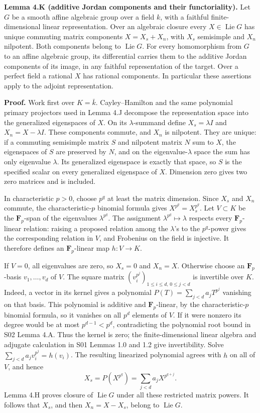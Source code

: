 \documentclass[11pt,a4paper,openany]{report}
\begin{document}
\textbf{Lemma 4.K (additive Jordan components and their functoriality).} Let \(G\) be a smooth affine algebraic group over a field \(k\), with a faithful finite-dimensional linear representation. Over an algebraic closure every \(X\in\operatorname{Lie}G\) has unique commuting matrix components \(X=X_s+X_n\), with \(X_s\) semisimple and \(X_n\) nilpotent. Both components belong to \(\operatorname{Lie}G\). For every homomorphism from \(G\) to an affine algebraic group, its differential carries them to the additive Jordan components of its image, in any faithful representation of the target. Over a perfect field a rational \(X\) has rational components. In particular these assertions apply to the adjoint representation.

\textbf{Proof.} Work first over \(K=\bar k\). Cayley--Hamilton and the same polynomial primary projectors used in Lemma 4.J decompose the representation space into the generalized eigenspaces of \(X\). On its \(\lambda\)-summand define \(X_s=\lambda I\) and \(X_n=X-\lambda I\). These components commute, and \(X_n\) is nilpotent. They are unique: if a commuting semisimple matrix \(S\) and nilpotent matrix \(N\) sum to \(X\), the eigenspaces of \(S\) are preserved by \(N\), and on the eigenvalue-\(\lambda\) space the sum has only eigenvalue \(\lambda\). Its generalized eigenspace is exactly that space, so \(S\) is the specified scalar on every generalized eigenspace of \(X\). Dimension zero gives two zero matrices and is included.

In characteristic \(p>0\), choose \(p^q\) at least the matrix dimension. Since \(X_s\) and \(X_n\) commute, the characteristic-\(p\) binomial formula gives \(X^{p^q}=X_s^{p^q}\). Let \(V\subset K\) be the \(\mathbf F_p\)-span of the eigenvalues \(\lambda^{p^q}\). The assignment \(\lambda^{p^q}\mapsto\lambda\) respects every \(\mathbf F_p\)-linear relation: raising a proposed relation among the \(\lambda\)'s to the \(p^q\)-power gives the corresponding relation in \(V\), and Frobenius on the field is injective. It therefore defines an \(\mathbf F_p\)-linear map \(h:V\to K\).

If \(V=0\), all eigenvalues are zero, so \(X_s=0\) and \(X_n=X\). Otherwise choose an \(\mathbf F_p\)-basis \(v_1,\ldots,v_d\) of \(V\). The square matrix \((v_i^{p^j})_{1\leq i\leq d,\,0\leq j<d}\) is invertible over \(K\). Indeed, a vector in its kernel gives a polynomial \(P(T)=\sum_{j<d}a_jT^{p^j}\) vanishing on that basis. This polynomial is additive and \(\mathbf F_p\)-linear, by the characteristic-\(p\) binomial formula, so it vanishes on all \(p^d\) elements of \(V\). If it were nonzero its degree would be at most \(p^{d-1}<p^d\), contradicting the polynomial root bound in S02 Lemma 4.A. Thus the kernel is zero; the finite-dimensional linear algebra and adjugate calculation in S01 Lemmas 1.0 and 1.2 give invertibility. Solve \(\sum_{j<d}a_jv_i^{p^j}=h(v_i)\). The resulting linearized polynomial agrees with \(h\) on all of \(V\), and hence \[
 X_s=P(X^{p^q})=\sum_{j<d}a_jX^{p^{q+j}}.
\] Lemma 4.H proves closure of \(\operatorname{Lie}G\) under all these restricted matrix powers. It follows that \(X_s\), and then \(X_n=X-X_s\), belong to \(\operatorname{Lie}G\).
\end{document}
